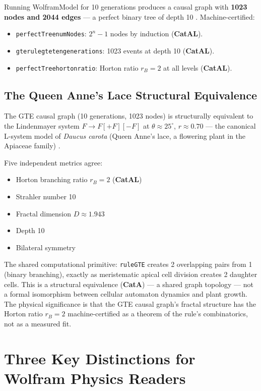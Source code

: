 \documentclass[11pt,a4paper]{article}
\newcommand{\lean}[1]{%
  \penalty-100
  \begingroup\def\_{\textunderscore\allowbreak}\texttt{#1}\endgroup}
\newcommand{\CatAL}{\textbf{CatAL}}
\newcommand{\CatA}{\textbf{CatA}}
\begin{document}
Running WolframModel for 10 generations produces a causal graph with
\textbf{1023 nodes and 2044 edges} — a perfect binary tree of depth 10
\cite{SpivackGTECompleteFramework}.  Machine-certified:
\begin{itemize}[itemsep=2pt]
  \item \lean{perfectTree\_numNodes}: $2^n - 1$ nodes by induction (\CatAL).
  \item \lean{gte\_rulegte\_ten\_generations}: 1023 events at depth 10 (\CatAL).
  \item \lean{perfectTree\_horton\_ratio}: Horton ratio $r_B = 2$ at all levels (\CatAL).
\end{itemize}

\subsection{The Queen Anne's Lace Structural Equivalence}

The GTE causal graph (10 generations, 1023 nodes) is structurally equivalent to
the Lindenmayer system $F \to F[+F][-F]$ at $\theta \approx 25^\circ$, $r \approx 0.70$
— the canonical L-system model of \emph{Daucus carota} (Queen Anne's lace, a
flowering plant in the Apiaceae family) \cite{SpivackGTECompleteFramework}.

Five independent metrics agree:
\begin{itemize}[itemsep=2pt]
  \item Horton branching ratio $r_B = 2$ (\CatAL)
  \item Strahler number 10
  \item Fractal dimension $D \approx 1.943$
  \item Depth 10
  \item Bilateral symmetry
\end{itemize}

The shared computational primitive: \texttt{ruleGTE} creates 2 overlapping pairs
from 1 (binary branching), exactly as meristematic apical cell division creates
2 daughter cells.  This is a structural equivalence (\CatA) — a shared graph
topology — not a formal isomorphism between cellular automaton dynamics and
plant growth.  The physical significance is that the GTE causal graph's fractal
structure has the Horton ratio $r_B = 2$ machine-certified as a theorem of the
rule's combinatorics, not as a measured fit.

\section{Three Key Distinctions for Wolfram Physics Readers}
\label{sec:distinctions}
\end{document}

